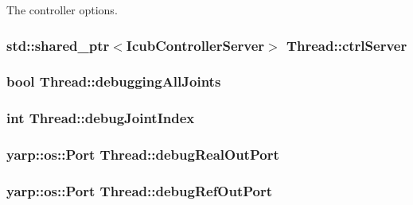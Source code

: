 \-The controller options. \hypertarget{classThread_ace1179249de64e545f43dc48529fbbb6}{
\subsubsection[{ctrl\-Server}]{\setlength{\rightskip}{0pt plus 5cm}std\-::shared\-\_\-ptr$<${\bf \-Icub\-Controller\-Server}$>$ {\bf \-Thread\-::ctrl\-Server}}}\label{classThread_ace1179249de64e545f43dc48529fbbb6}
\hypertarget{classThread_aba345996b91a57d9e1f2dd15c7c75e08}{
\subsubsection[{debugging\-All\-Joints}]{\setlength{\rightskip}{0pt plus 5cm}bool {\bf \-Thread\-::debugging\-All\-Joints}}}\label{classThread_aba345996b91a57d9e1f2dd15c7c75e08}
\hypertarget{classThread_aedf960b8e991868561f35193702245b0}{
\subsubsection[{debug\-Joint\-Index}]{\setlength{\rightskip}{0pt plus 5cm}int {\bf \-Thread\-::debug\-Joint\-Index}}}\label{classThread_aedf960b8e991868561f35193702245b0}
\hypertarget{classThread_a9bd7f6aebc0be4709f32f95aa32f1add}{
\subsubsection[{debug\-Real\-Out\-Port}]{\setlength{\rightskip}{0pt plus 5cm}yarp\-::os\-::\-Port {\bf \-Thread\-::debug\-Real\-Out\-Port}}}\label{classThread_a9bd7f6aebc0be4709f32f95aa32f1add}
\hypertarget{classThread_a3780b51f82c50fd2738afbd0ae9b9526}{
\subsubsection[{debug\-Ref\-Out\-Port}]{\setlength{\rightskip}{0pt plus 5cm}yarp\-::os\-::\-Port {\bf \-Thread\-::debug\-Ref\-Out\-Port}}}\label{classThread_a3780b51f82c50fd2738afbd0ae9b9526}
